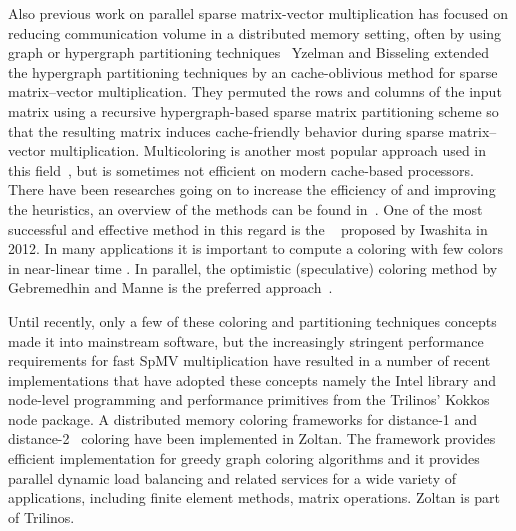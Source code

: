 Also previous work on parallel sparse matrix-vector multiplication has focused on reducing communication volume in a distributed memory setting, often by using graph or hypergraph partitioning techniques~\cite{Catalyurek:1999} Yzelman and Bisseling \cite{doi:10.1137/080733243,Yzelman-thesis-2011} extended the  hypergraph partitioning techniques by an cache-oblivious method for sparse matrix–vector multiplication. They permuted the rows and columns of the input matrix using a recursive hypergraph-based sparse matrix partitioning scheme so that the resulting matrix induces cache-friendly behavior during sparse matrix–vector multiplication. Multicoloring is another most popular approach used in this field~\cite{MC}, but is sometimes not efficient on modern cache-based processors. There have been researches going on to increase the efficiency of \MCfull and improving the heuristics, an overview of the methods can be found in~\cite{equitable_color,dist_k_def,COLPACK}. One of the most successful and effective method in this regard is the \ABMCfull~\cite{ABMC} proposed by Iwashita \etal in 2012. In many applications it is important to compute a coloring with few colors in near-linear time \cite{doi:10.1137/13093426X}. In parallel, the optimistic (speculative) coloring method by Gebremedhin and Manne \cite{gebremedhin2000scalable} is the preferred approach~\cite{Boman:2016}. 

Until recently, only a few of these coloring and partitioning techniques concepts made it into mainstream software, but the increasingly stringent performance requirements for fast SpMV multiplication have resulted in a number of recent implementations that have adopted these concepts namely the Intel \MKL library\cite{MKL} and node-level programming and performance primitives from the Trilinos’ Kokkos node package\cite{kokkos}. A distributed memory coloring frameworks for distance-1\cite{BOZDAG2008515} and distance-2~\cite{doi:10.1137/080732158} coloring have been implemented in Zoltan. The framework provides efficient implementation for greedy graph coloring algorithms and it provides parallel dynamic load balancing and related services for a wide variety of applications, including finite element methods, matrix operations. Zoltan is part of Trilinos.


